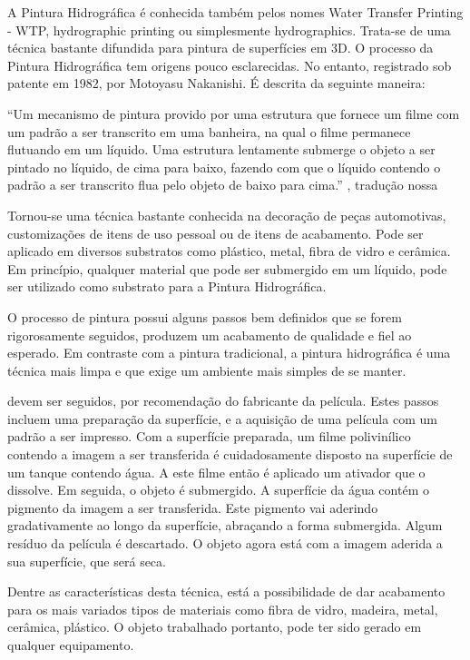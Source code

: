 A Pintura Hidrográfica é conhecida também pelos nomes Water Transfer Printing - WTP, hydrographic printing ou simplesmente hydrographics. Trata-se de uma técnica bastante difundida para pintura de superfícies em 3D. O processo da Pintura Hidrográfica tem origens pouco esclarecidas. No entanto, registrado sob patente em 1982, por Motoyasu Nakanishi. É descrita da seguinte maneira:

“Um mecanismo de pintura provido por uma estrutura que fornece um filme com um padrão a ser transcrito em uma banheira, na qual o filme permanece flutuando em um líquido. Uma estrutura lentamente submerge o objeto a ser pintado no líquido, de cima para baixo, fazendo com que o líquido contendo o padrão a ser transcrito flua pelo objeto de baixo para cima.” 
\cite{Nakanishi1984}, tradução nossa

Tornou-se uma técnica bastante conhecida na decoração de peças automotivas, customizações de itens de uso pessoal ou de itens de acabamento. Pode ser aplicado em diversos substratos como plástico, metal, fibra de vidro e cerâmica. Em princípio, qualquer material que pode ser submergido em um líquido, pode ser utilizado como substrato para a Pintura Hidrográfica.

O processo de pintura possui alguns passos bem definidos que se forem rigorosamente seguidos, produzem um acabamento de qualidade e fiel ao esperado. Em contraste com a pintura tradicional, a pintura hidrográfica é uma técnica mais limpa e que exige um ambiente mais simples de se manter.

devem ser seguidos, por recomendação do fabricante da película. Estes passos incluem uma preparação da superfície, e a aquisição de uma película com um padrão a ser impresso.
Com a superfície preparada, um filme polivinílico contendo a imagem a ser transferida é cuidadosamente disposto na superfície de um tanque contendo água. A este filme então é aplicado um ativador que o dissolve. Em seguida, o objeto é submergido. A superfície da água contém o pigmento da imagem a ser transferida. Este pigmento vai aderindo gradativamente ao longo da superfície, abraçando a forma submergida. Algum resíduo da película é descartado. O objeto agora está com a imagem aderida a sua superfície, que será seca.

Dentre as características desta técnica, está a possibilidade de dar acabamento para os mais variados tipos de materiais como fibra de vidro, madeira, metal, cerâmica, plástico. O objeto trabalhado portanto, pode ter sido gerado em qualquer equipamento.

